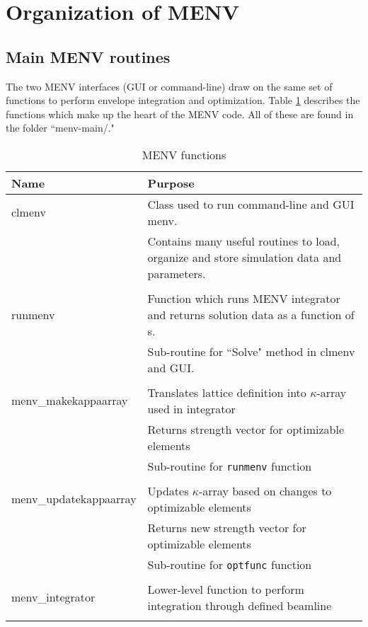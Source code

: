 \documentclass[../menv_main.tex]{subfiles}
\begin{document}
\section{Organization of MENV}

\subsection{Main MENV routines}
The two MENV interfaces (GUI or command-line) draw on the same set of functions to perform envelope integration and optimization. Table \ref{tab:menv-func} describes the functions which make up the heart of the MENV code. All of these are found in the folder ``menv-main/."


\begin{table}[htb]
\centering
\caption{MENV functions}
\label{tab:menv-func}
\vspace{10pt}
\begin{tabularx}{\textwidth}{l X}
\hline
 Name & Purpose \\
\hline
clmenv 		& Class used to run command-line and GUI menv. \\
			& Contains many useful routines to load, organize and store simulation data and parameters.  \\
			&\\
runmenv 	& Function which runs MENV integrator and returns solution data as a function of s. \\
			& Sub-routine for ``Solve" method in clmenv and GUI. \\
			&\\
menv\_makekappaarray 	& Translates lattice definition into $\kappa$-array used in integrator\\
						& Returns strength vector for optimizable elements 					  \\
						& Sub-routine for \verb|runmenv| function \\
						&\\
menv\_updatekappaarray 	& Updates $\kappa$-array based on changes to optimizable elements	\\
						& Returns new strength vector for optimizable elements 					  \\
						& Sub-routine for \verb|optfunc| function \\
						&\\
menv\_integrator 		& Lower-level function to perform integration through defined beamline \\
						&\\

\end{tabularx}
\end{table}
\end{document}
